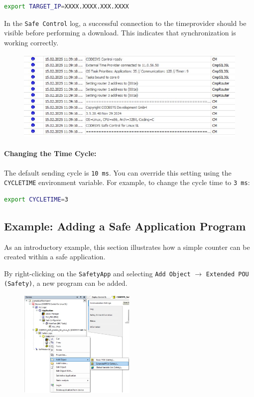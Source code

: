 \documentclass[a4paper,12pt]{article}
\begin{document}
\begin{lstlisting}[language=bash]
export TARGET_IP=XXXX.XXXX.XXX.XXXX
\end{lstlisting}

In the \texttt{Safe Control} log, a successful connection to the timeprovider should be visible before performing a download. This indicates that synchronization is working correctly.

\begin{figure}[H]
\centering
\includegraphics[width=1\textwidth]{15.JPG}
\end{figure}

\paragraph{Changing the Time Cycle:}  
The default sending cycle is \texttt{10 ms}. You can override this setting using the \texttt{CYCLETIME} environment variable. For example, to change the cycle time to \texttt{3 ms}:

\begin{lstlisting}[language=bash]
export CYCLETIME=3
\end{lstlisting}


\subsection{Example: Adding a Safe Application Program}

As an introductory example, this section illustrates how a simple counter can be created within a safe application.

By right-clicking on the \texttt{SafetyApp} and selecting \texttt{Add Object} $\rightarrow$ \texttt{Extended POU (Safety)}, a new program can be added.

\begin{figure}[H]
	\centering
	\includegraphics[width=0.5\textwidth]{e1.JPG}
\end{figure}
\end{document}
